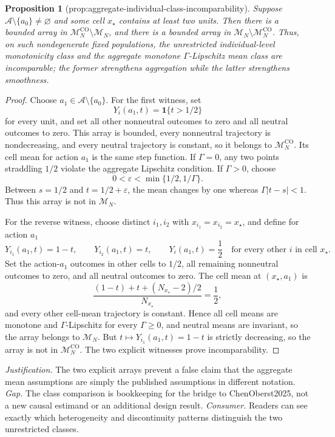 \documentclass{article}
\newtheorem{proposition}{Proposition}
\begin{document}
\begin{proposition}[prop:aggregate-individual-class-incomparability]\label{prop:aggregate-individual-class-incomparability}
Suppose \(\mathcal A\setminus\{a_0\}\neq\varnothing\) and some cell \(x_\star\) contains at least two units.  Then there is a bounded array in \(\mathcal M_N^{\mathrm{CO}}\setminus\mathcal M_N\), and there is a bounded array in \(\mathcal M_N\setminus\mathcal M_N^{\mathrm{CO}}\).  Thus, on such nondegenerate fixed populations, the unrestricted individual-level monotonicity class and the aggregate monotone \(\Gamma\)-Lipschitz mean class are incomparable; the former strengthens aggregation while the latter strengthens smoothness.
\end{proposition}
\begin{proof}
Choose \(a_1\in\mathcal A\setminus\{a_0\}\).  For the first witness, set
\[
Y_i(a_1,t)=\mathbf 1\{t>1/2\}
\]
for every unit, and set all other nonneutral outcomes to zero and all neutral outcomes to zero.  This array is bounded, every nonneutral trajectory is nondecreasing, and every neutral trajectory is constant, so it belongs to \(\mathcal M_N^{\mathrm{CO}}\).  Its cell mean for action \(a_1\) is the same step function.  If \(\Gamma=0\), any two points straddling \(1/2\) violate the aggregate Lipschitz condition.  If \(\Gamma>0\), choose
\[
0<\varepsilon<\min\{1/2,1/\Gamma\}.
\]
Between \(s=1/2\) and \(t=1/2+\varepsilon\), the mean changes by one whereas \(\Gamma|t-s|<1\).  Thus this array is not in \(\mathcal M_N\).

For the reverse witness, choose distinct \(i_1,i_2\) with \(x_{i_1}=x_{i_2}=x_\star\), and define for action \(a_1\)
\[
Y_{i_1}(a_1,t)=1-t,
\qquad
Y_{i_2}(a_1,t)=t,
\qquad
Y_i(a_1,t)=\frac12
\quad\text{for every other }i\text{ in cell }x_\star.
\]
Set the action-\(a_1\) outcomes in other cells to \(1/2\), all remaining nonneutral outcomes to zero, and all neutral outcomes to zero.  The cell mean at \((x_\star,a_1)\) is
\[
\frac{(1-t)+t+(N_{x_\star}-2)/2}{N_{x_\star}}=\frac12,
\]
and every other cell-mean trajectory is constant.  Hence all cell means are monotone and \(\Gamma\)-Lipschitz for every \(\Gamma\geq0\), and neutral means are invariant, so the array belongs to \(\mathcal M_N\).  But \(t\mapsto Y_{i_1}(a_1,t)=1-t\) is strictly decreasing, so the array is not in \(\mathcal M_N^{\mathrm{CO}}\).  The two explicit witnesses prove incomparability.
\end{proof}
\par\smallskip\noindent \textit{Justification.} The two explicit arrays prevent a false claim that the aggregate mean assumptions are simply the published assumptions in different notation. \textit{Gap.} The class comparison is bookkeeping for the bridge to ChenOberst2025, not a new causal estimand or an additional design result. \textit{Consumer.} Readers can see exactly which heterogeneity and discontinuity patterns distinguish the two unrestricted classes.
\end{document}
